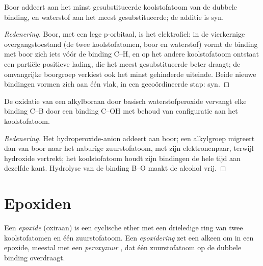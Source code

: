 \begin{proposition}\label{prop:b2:alkene-redox:hydroboration-regio}
Boor addeert aan het minst gesubstitueerde koolstofatoom van de dubbele binding, en waterstof aan het meest
gesubstitueerde; de additie is syn.
\end{proposition}

\begin{proof}[Redenering]
Boor, met een lege p-orbitaal, is het elektrofiel: in de vierkernige overgangstoestand
(de twee koolstofatomen, boor en waterstof) vormt de binding met boor zich iets vóór de binding C--H, en
op het andere koolstofatoom ontstaat een partiële positieve lading, die het meest
gesubstitueerde beter draagt; de omvangrijke boorgroep verkiest ook het minst gehinderde uiteinde. Beide nieuwe bindingen
vormen zich aan één vlak, in een gecoördineerde stap: syn.
\end{proof}

\begin{proposition}\label{prop:b2:alkene-redox:retention}
De oxidatie van een alkylboraan door basisch waterstofperoxide vervangt elke binding C--B door een
binding C--OH met behoud van configuratie aan het koolstofatoom.
\end{proposition}

\begin{proof}[Redenering]
Het hydroperoxide-anion addeert aan boor; een alkylgroep migreert dan van boor naar het
naburige zuurstofatoom, met zijn elektronenpaar, terwijl hydroxide vertrekt; het koolstofatoom houdt zijn bindingen
de hele tijd aan dezelfde kant. Hydrolyse van de binding B--O maakt de alcohol vrij.
\end{proof}

\section{Epoxiden}

\begin{definition}[Epoxide]\label{def:b2:alkene-redox:epoxide}
Een \emph{epoxide} (oxiraan) is een cyclische ether met een drieledige ring van
twee koolstofatomen en één zuurstofatoom. Een \emph{epoxidering} zet een alkeen om in
een epoxide, meestal met een \emph{peroxyzuur} , dat
één zuurstofatoom op de dubbele binding overdraagt.
\end{definition}

